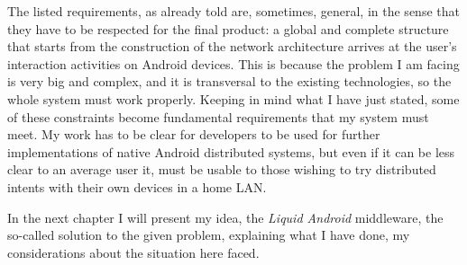 The listed requirements, as already told are, sometimes, general, in the sense that they have to be respected for the final product: a global and complete structure that starts from the construction of the network architecture arrives at the user's interaction activities on Android devices. This is because the problem I am facing is very big and complex, and it is transversal to the existing technologies, so the whole system must work properly. Keeping in mind what I have just stated, some of these constraints become fundamental requirements that my system must meet. My work has to be clear for developers to be used for further implementations of native Android distributed systems, but even if it can be less clear to an average user it, must be usable to those wishing to try distributed intents with their own devices in a home LAN.

\bigskip
\bigskip
\bigskip
\bigskip
\bigskip
\bigskip
\par
In the next chapter I will present my idea, the \textit{Liquid Android} middleware, the so-called solution to the given problem, explaining what I have done, my considerations about the situation here faced.

%
